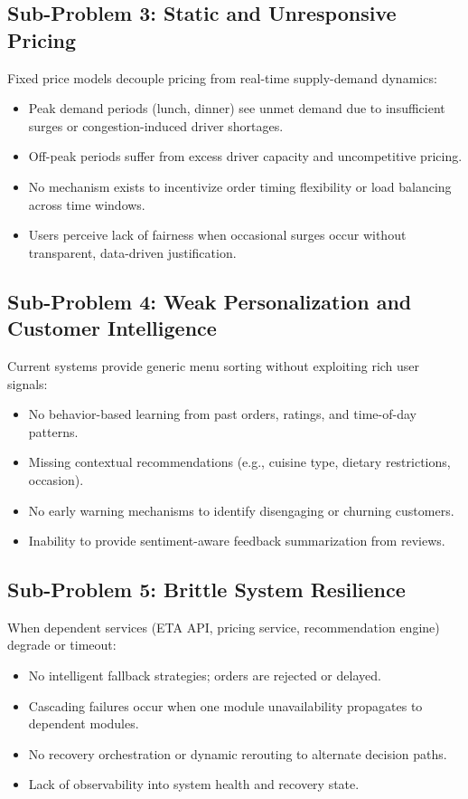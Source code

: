 \documentclass[12pt,a4paper]{report}
\begin{document}
\subsection{Sub-Problem 3: Static and Unresponsive Pricing}
Fixed price models decouple pricing from real-time supply-demand dynamics:
\begin{itemize}
    \item Peak demand periods (lunch, dinner) see unmet demand due to insufficient surges or congestion-induced driver shortages.
    \item Off-peak periods suffer from excess driver capacity and uncompetitive pricing.
    \item No mechanism exists to incentivize order timing flexibility or load balancing across time windows.
    \item Users perceive lack of fairness when occasional surges occur without transparent, data-driven justification.
\end{itemize}

\subsection{Sub-Problem 4: Weak Personalization and Customer Intelligence}
Current systems provide generic menu sorting without exploiting rich user signals:
\begin{itemize}
    \item No behavior-based learning from past orders, ratings, and time-of-day patterns.
    \item Missing contextual recommendations (e.g., cuisine type, dietary restrictions, occasion).
    \item No early warning mechanisms to identify disengaging or churning customers.
    \item Inability to provide sentiment-aware feedback summarization from reviews.
\end{itemize}

\subsection{Sub-Problem 5: Brittle System Resilience}
When dependent services (ETA API, pricing service, recommendation engine) degrade or timeout:
\begin{itemize}
    \item No intelligent fallback strategies; orders are rejected or delayed.
    \item Cascading failures occur when one module unavailability propagates to dependent modules.
    \item No recovery orchestration or dynamic rerouting to alternate decision paths.
    \item Lack of observability into system health and recovery state.
\end{itemize}
\end{document}
